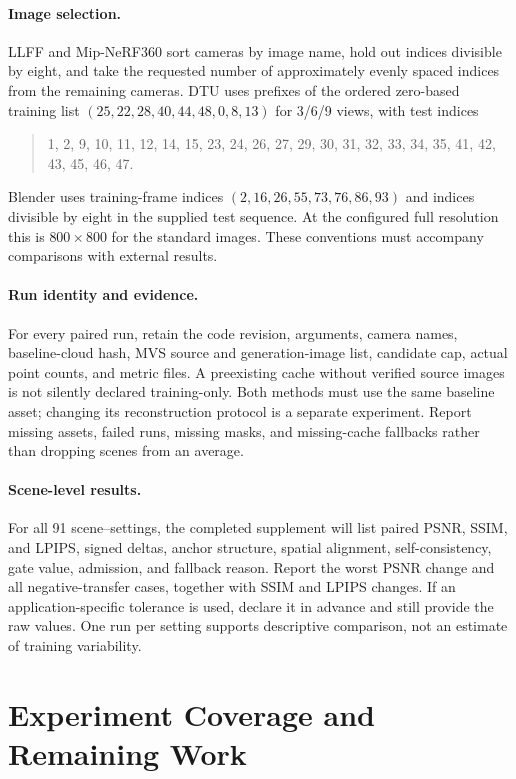 \documentclass{article}
\begin{document}
\paragraph{Image selection.}
LLFF and Mip-NeRF360 sort cameras by image name, hold out indices divisible by eight, and take the requested number of approximately evenly spaced indices from the remaining cameras. DTU uses prefixes of the ordered zero-based training list $(25,22,28,40,44,48,0,8,13)$ for 3/6/9 views, with test indices
\begin{quote}\small
1, 2, 9, 10, 11, 12, 14, 15, 23, 24, 26, 27, 29, 30, 31, 32, 33, 34, 35, 41, 42, 43, 45, 46, 47.
\end{quote}
Blender uses training-frame indices $(2,16,26,55,73,76,86,93)$ and indices divisible by eight in the supplied test sequence. At the configured full resolution this is $800\times800$ for the standard images. These conventions must accompany comparisons with external results.

\paragraph{Run identity and evidence.}
For every paired run, retain the code revision, arguments, camera names, baseline-cloud hash, MVS source and generation-image list, candidate cap, actual point counts, and metric files. A preexisting cache without verified source images is not silently declared training-only. Both methods must use the same baseline asset; changing its reconstruction protocol is a separate experiment. Report missing assets, failed runs, missing masks, and missing-cache fallbacks rather than dropping scenes from an average.

\paragraph{Scene-level results.}
For all 91 scene--settings, the completed supplement will list paired PSNR, SSIM, and LPIPS, signed deltas, anchor structure, spatial alignment, self-consistency, gate value, admission, and fallback reason. Report the worst PSNR change and all negative-transfer cases, together with SSIM and LPIPS changes. If an application-specific tolerance is used, declare it in advance and still provide the raw values. One run per setting supports descriptive comparison, not an estimate of training variability.

\section{Experiment Coverage and Remaining Work}
\label{app:execution}
\end{document}
